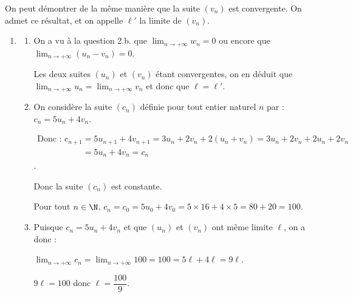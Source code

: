On peut démontrer de la même manière que la suite $\left(v_n\right)$ est convergente. On admet ce résultat, et on appelle $\ell'$ la limite de $\left(v_n\right)$.
\begin{enumerate}[resume]
\item 
	\begin{enumerate}
		\item 
		On a vu à la question 2.b. que $\displaystyle\lim_{n \to + \infty} w_n = 0$ ou encore que $\displaystyle\lim_{n \to + \infty}\left ( u_n - v_n\right ) = 0$.
		
Les deux suites $(u_n)$ et $(v_n)$ étant convergentes, on en déduit que
$\displaystyle\lim_{n \to + \infty} u_n  = \lim_{n \to + \infty} v_n $		
		 et donc que  $\ell = \ell'$.
		\item On considère la suite $\left(c_n\right)$ définie pour tout entier naturel $n$ par : $c_n = 5u_n + 4v_n$.
		



$\begin{gathered}\text{Donc : }c_{n+1} = 5u_{n+1} + 4v_{n+1} = 3u_n + 2v_n + 2\left(u_n  + v_n \right) = 3u_n + 2v_n + 2u_n  + 2v_n \\
\phantom{\text{Donc : }c_{n+1}}= 5u_n + 4v_n = c_n\end{gathered}$. 

Donc la suite  $\left(c_n\right)$ est constante.


Pour tout $n\in\N$,  $c_n = c_0 = 5u_0 + 4v_0 = 5 \times 16 + 4 \times 5 = 80 + 20 = 100$.
		\item 
Puisque $c_n = 5u_n + 4v_n$ et que $\left(u_n\right)$ et $\left(v_n\right)$ ont même limite $\ell$, on a donc :

$\displaystyle\lim_{n \to + \infty}c_n = \displaystyle\lim_{n \to + \infty}100 = 100 = 5\ell + 4\ell = 9\ell$.

$9\ell = 100$ donc $\ell = \dfrac{100}{9}$.
	\end{enumerate}
\end{enumerate}

\bigskip
